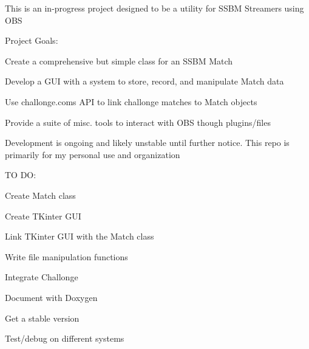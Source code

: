 This is an in-\/progress project designed to be a utility for S\+S\+BM Streamers using O\+BS

Project Goals\+:
\begin{DoxyItemize}
\item Create a comprehensive but simple class for an S\+S\+BM Match
\item Develop a G\+UI with a system to store, record, and manipulate Match data
\item Use challonge.\+com\textquotesingle{}s A\+PI to link challonge matches to Match objects
\item Provide a suite of misc. tools to interact with O\+BS though plugins/files
\end{DoxyItemize}

Development is ongoing and likely unstable until further notice. This repo is primarily for my personal use and organization

TO DO\+:
\begin{DoxyItemize}
\item Create Match class
\item Create T\+Kinter G\+UI
\item Link T\+Kinter G\+UI with the Match class
\item Write file manipulation functions
\item Integrate Challonge
\item Document with Doxygen
\item Get a stable version
\item Test/debug on different systems 
\end{DoxyItemize}